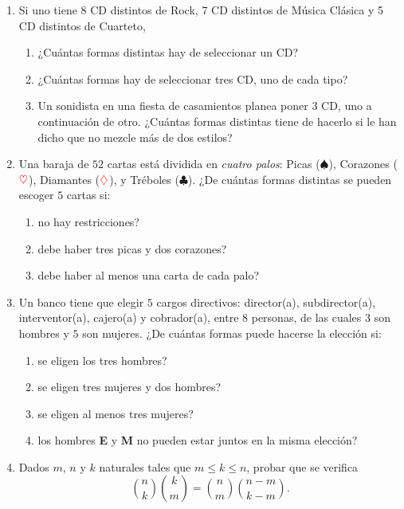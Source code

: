 \documentclass[a4paper,12pt,twoside,spanish,reqno]{amsbook}
\numberwithin{equation}{section}
\begin{document}
\begin {enumerate}
\item Si uno tiene 8 CD distintos de Rock, 7 CD distintos de Música Clásica y 5 CD distintos de Cuarteto,
\begin{enumerate}
	\item ¿Cuántas formas distintas hay de seleccionar un CD?
	
	\item ¿Cuántas formas hay de seleccionar tres CD, uno de cada tipo?
	
	\item Un sonidista en una fiesta de casamientos planea poner 3 CD, uno a \linebreak continuación de otro. ¿Cuántas formas distintas tiene de hacerlo si le han dicho que no mezcle más de dos estilos?
\end{enumerate}


\item Una baraja de $52$ cartas está dividida en \textit{cuatro palos}: Picas ($\spadesuit$), Corazones ($\textcolor{red}{\heartsuit}$),
Diamantes ($\textcolor{red}{\diamondsuit}$), y Tréboles ($\clubsuit$). ¿De cuántas formas distintas se pueden escoger $5$  cartas si:
\begin{enumerate}
	\item no hay restricciones?
	\item debe haber tres picas y dos corazones?
	\item debe haber al menos una carta de cada palo?
\end{enumerate}


\item Un banco tiene que elegir $5$ cargos directivos: director(a), subdirector(a), \linebreak interventor(a), cajero(a) y cobrador(a), entre $8$ personas,
de las cuales $3$ son hombres y $5$ son mujeres.  ¿De cuántas formas puede hacerse la elección si:
\begin{enumerate}
	\item se eligen los tres hombres?
	\item se eligen tres mujeres y dos hombres?
	\item se eligen al menos tres mujeres?
	\item los hombres \textbf{E} y \textbf{M} no pueden estar juntos en la misma elección?
\end{enumerate}


\item Dados $m$, $n$ y $k$ naturales tales que $m \le k \le n$, probar que se verifica
\begin{equation*}
    \binom{n}{k}\binom{k}{m} = \binom{n}{m}\binom{n-m}{k-m}.
\end{equation*}




\end{enumerate}
\end{document}
